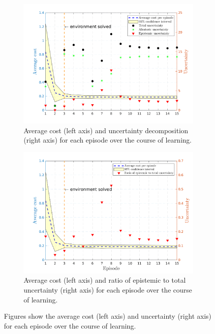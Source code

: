 \begin{figure}[htp!]    
  \begin{subfigure}[b]{1\linewidth}
    \centering
    \includegraphics[height=0.4\textheight,width=1\textwidth]{Chapter3/Figures/cp_uncertainty.png} 
    \caption{Average cost (left axis) and uncertainty decomposition (right axis) for each episode over the course of learning.} 
    \label{Fig:Re-cp-uncertainty} 
  \end{subfigure}
  
  \begin{subfigure}[b]{1\linewidth}
    \centering
    \includegraphics[height=0.4\textheight,width=1\textwidth]{Chapter3/Figures/cp_uncertainty_norm.png} 
    \caption{Average cost (left axis) and ratio of epistemic to total uncertainty (right axis) for each episode over the course of learning.} 
    \label{Fig:Re-cp-uncertainty-norm} 
  \end{subfigure}  
\caption[Uncertainty decomposition for \textbf{cart-pole} environment]{Figures show the average cost (left axis) and uncertainty (right axis) for each episode over the course of learning.}
\label{Fig:Re-cp-full-uncertainty} 
\end{figure}
 
